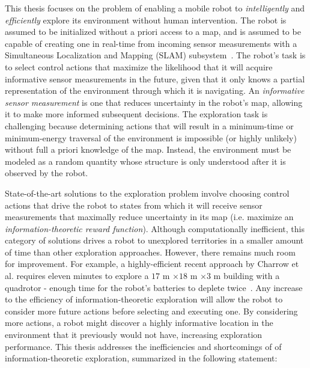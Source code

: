 This thesis focuses on the problem of enabling a mobile robot to
\textit{intelligently} and \textit{efficiently} explore its environment
without human intervention. The robot is assumed to be initialized without a
priori access to a map, and is assumed to be capable of creating one in
real-time from incoming sensor measurements with a Simultaneous Localization and
Mapping (SLAM) subsystem~\cite{thrun2005probabilistic}. The robot's task is to select control actions that
maximize the likelihood that it will acquire informative sensor measurements
in the future, given that it only knows a partial representation of the
environment through which it is navigating. An \textit{informative sensor measurement}
is one that reduces uncertainty in the robot's map, allowing it to make
more informed subsequent decisions. The exploration task is
challenging because determining actions that will result in a minimum-time or
minimum-energy traversal of the environment is impossible (or highly unlikely) without
full a priori knowledge of the map. Instead, the environment must be modeled as a random
quantity whose structure is only understood after it is observed by the robot.

State-of-the-art solutions to the exploration problem involve choosing control actions
that drive the robot to states from which it will receive sensor measurements that
maximally reduce uncertainty in its map (i.e. maximize an \textit{information-theoretic
reward function}). Although computationally
inefficient, this category of solutions drives a robot to unexplored territories
in a smaller amount of time than other exploration approaches. However, there
remains much room for improvement. For example, a highly-efficient recent approach by
Charrow et al. requires eleven minutes to explore a $17$ m $\times 18$ m $\times
3$ m building with a quadrotor - enough time for the robot's batteries to
deplete twice~\cite{charrow2015icra}. Any increase to the efficiency of
information-theoretic exploration will allow the robot to consider more future
actions before selecting and executing one. By considering more actions, a robot
might discover a highly informative location in the environment that it
previously would not have, increasing exploration performance. This thesis addresses
the inefficiencies and shortcomings of
of information-theoretic exploration, summarized in the following statement:

\begin{center}  \end{center}

